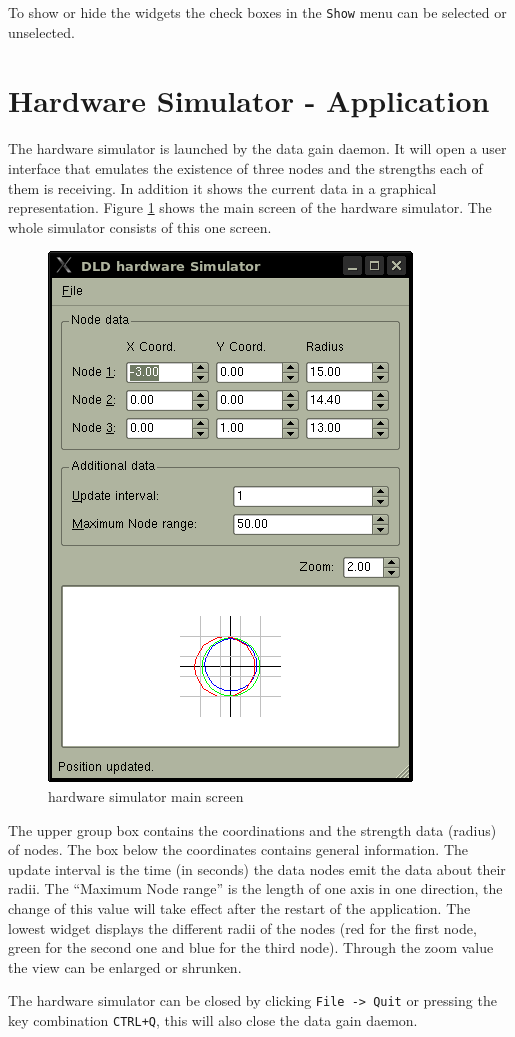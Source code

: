   To show or hide the widgets the check boxes in the \texttt{Show} menu can be selected or unselected.
 \section{Hardware Simulator - Application}
 \label{sec:manual:hardwareSimulator}
  The hardware simulator is launched by the data gain daemon. It will open a user interface that emulates the existence of three nodes and the strengths each of them is receiving. In addition it shows the current data in a graphical representation. Figure \ref{fg:manual:hardwareSimulator:mainScreen} shows the main screen of the hardware simulator. The whole simulator consists of this one screen.
  \begin{figure}[h]
   \centering
   \includegraphics[scale=0.5]{images/UserManual/hwSim/mainScreen.png}
   \caption{hardware simulator main screen}
   \label{fg:manual:hardwareSimulator:mainScreen}
  \end{figure}
  The upper group box contains the coordinations and the strength data (radius) of nodes. The box below the coordinates contains general information. The update interval is the time (in seconds) the data nodes emit the data about their radii. The ``Maximum Node range'' is the length of one axis in one direction, the change of this value will take effect after the restart of the application. The lowest widget displays the different radii of the nodes (red for the first node, green for the second one and blue for the third node). Through the zoom value the view can be enlarged or shrunken.

  The hardware simulator can be closed by clicking \texttt{File -> Quit} or pressing the key combination \texttt{CTRL+Q}, this will also close the data gain daemon.
